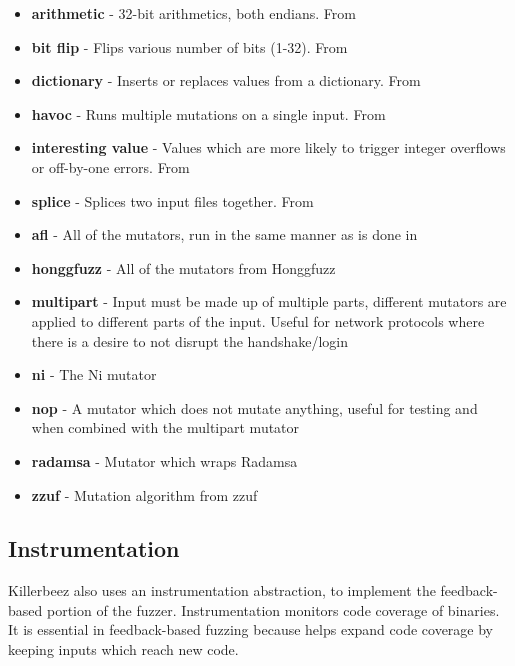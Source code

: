 \begin{itemize}[noitemsep]
\item \textbf{arithmetic} - 32-bit arithmetics, both endians. From \AFL{}
\item \textbf{bit flip} - Flips various number of bits (1-32). From \AFL{}
\item \textbf{dictionary} - Inserts or replaces values from a dictionary. From \AFL{}
\item \textbf{havoc} - Runs multiple mutations on a single input. From \AFL{}
\item \textbf{interesting value} - Values which are more likely to trigger
                                   integer overflows or off-by-one errors. From
                                   \AFL{}
\item \textbf{splice} - Splices two input files together. From \AFL{}
\item \textbf{afl} - All of the \AFL{} mutators, run in the same manner as is
                     done in \AFL{}
\item \textbf{honggfuzz} - All of the mutators from Honggfuzz
\item \textbf{multipart} - Input must be made up of multiple parts, different
                           mutators are applied to different parts of the
                           input. Useful for network protocols where there is
                           a desire to not disrupt the handshake/login
\item \textbf{ni} - The Ni mutator
\item \textbf{nop} - A mutator which does not mutate anything, useful for
                     testing and when combined with the multipart mutator
\item \textbf{radamsa} - Mutator which wraps Radamsa\cite{radamsa}
\item \textbf{zzuf} - Mutation algorithm from zzuf\cite{zzuf}
\end{itemize}




\subsection{Instrumentation}
Killerbeez also uses an instrumentation abstraction, to implement the
feedback-based portion of the fuzzer. Instrumentation monitors code coverage of
binaries. It is essential in feedback-based fuzzing because helps expand code
coverage by keeping inputs which reach new code.

